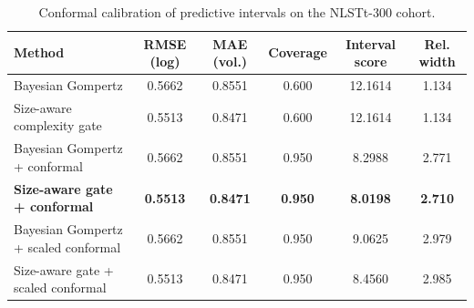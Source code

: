 \begin{table}[t]
\centering
\caption{Conformal calibration of predictive intervals on the NLSTt-300 cohort.}
\begin{tabular}{lccccc}
\toprule
Method & RMSE (log) & MAE (vol.) & Coverage & Interval score & Rel. width \\
\midrule
Bayesian Gompertz & 0.5662 & 0.8551 & 0.600 & 12.1614 & 1.134 \\
Size-aware complexity gate & 0.5513 & 0.8471 & 0.600 & 12.1614 & 1.134 \\
Bayesian Gompertz + conformal & 0.5662 & 0.8551 & 0.950 & 8.2988 & 2.771 \\
\textbf{Size-aware gate + conformal} & \textbf{0.5513} & \textbf{0.8471} & \textbf{0.950} & \textbf{8.0198} & \textbf{2.710} \\
Bayesian Gompertz + scaled conformal & 0.5662 & 0.8551 & 0.950 & 9.0625 & 2.979 \\
Size-aware gate + scaled conformal & 0.5513 & 0.8471 & 0.950 & 8.4560 & 2.985 \\
\bottomrule
\end{tabular}
\end{table}

